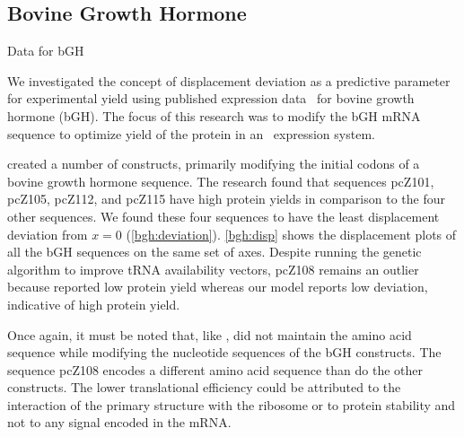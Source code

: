\documentclass[12pt]{article}
\begin{document}
\subsection{Bovine Growth Hormone}
\label{section:bgh}

\begin{cfigure}
  \footnotesize
  \caption{Data for bGH}
\end{cfigure}

We investigated the concept of displacement deviation as a predictive parameter
for experimental yield using published expression data~\cite{schoner:bgh} for bovine growth hormone (bGH).
The focus of this research was to modify the bGH mRNA sequence to optimize
yield of the protein in an \ecoli\ expression system.

\citet{schoner:bgh} created a number of constructs, primarily modifying the initial codons of a
bovine growth hormone sequence.  The research found that sequences pcZ101,
pcZ105, pcZ112, and pcZ115 have high protein yields
in comparison to the four other sequences. We found these four sequences  to have the least
displacement deviation from $x = 0$
(\autoref{bgh:deviation}). \autoref{bgh:disp} shows the displacement
plots of all the bGH sequences on the same set of axes. 
Despite running the genetic algorithm to improve tRNA availability vectors, pcZ108 remains an
outlier because \citeauthor{schoner:bgh} reported low protein
yield whereas our model reports low deviation, indicative of 
high protein yield.

Once again, it must be noted that, like \citeauthor{weiss87}, \citeauthor{schoner:bgh}
did not maintain the amino acid sequence while modifying the nucleotide sequences of the bGH constructs.
The sequence pcZ108 encodes a different amino acid sequence than do the other constructs.
The lower translational efficiency could be attributed to the interaction
of the primary structure with the ribosome or to protein stability and not to any signal encoded
in the mRNA.
\end{document}
